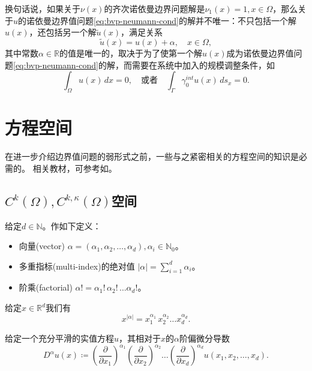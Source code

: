 换句话说，如果关于$\nu(x)$的齐次诺依曼边界问题解是$\nu_1(x)=1, x \in \Omega$，那么关于$u$的诺依曼边界值问题\eqref{eq:bvp-neumann-cond}的解并不唯一：不只包括一个解$u(x)$，还包括另一个解$\tilde{u}(x)$，满足关系
\begin{equation*}
  \tilde{u}(x) = u(x) + \alpha, \quad x \in \Omega,
\end{equation*}
其中常数$\alpha \in \mathbb{R}$的值是唯一的，取决于为了使第一个解$u(x)$成为诺依曼边界值问题\eqref{eq:bvp-neumann-cond}的解，而需要在系统中加入的规模调整条件，如
\begin{equation*}
  \int_{\Omega} u(x) \, dx = 0, \quad \text{或者} \quad \int_{\Gamma} \gamma_0^{int}u(x) \, ds_x =0.
\end{equation*}

\section{方程空间}
在进一步介绍边界值问题的弱形式之前，一些与之紧密相关的方程空间的知识是必需的。
相关教材，可参考如\cite{McLean:2000ta, Adams:2003wi, Tartar:2007vm, Mazya:2009vz, Mazya:2009wu}。

\subsection{\texorpdfstring{$C^{k}(\Omega),C^{k,\kappa}(\Omega)$}{CK}空间}

给定$d \in \mathbb{N}$。作如下定义：
\begin{itemize}
  \item 向量(vector) $\alpha = \left( \alpha_1, \alpha_2, \ldots, \alpha_d \right), \alpha_i \in \mathbb{N}_0$。
  \item 多重指标(multi-index)的绝对值 $\left| \alpha \right|=\sum_{i=1}^{d} \alpha_i$。
  \item 阶乘(factorial) $\alpha ! = \alpha_1! \, \alpha_2 ! \,  \ldots \alpha_d !$。
\end{itemize}

给定$x \in \mathbb{R}^d$我们有
\begin{equation*}
  x^{\left| \alpha \right|} = x_1^{\alpha_1} \, x_2^{\alpha_2} \ldots x_d^{\alpha_d}.
\end{equation*}

给定一个充分平滑的实值方程$u$，其相对于$x$的$\alpha$阶偏微分导数
\begin{equation*}
  D^{\alpha} u(x) \coloneqq \left( \frac{\partial }{\partial x_{1}} \right)^{\alpha_1} \left( \frac{\partial }{\partial x_{2}} \right)^{\alpha_2} \ldots \left( \frac{\partial }{\partial x_{d}} \right)^{\alpha_d} u \left( x_1, x_2, \ldots, x_d \right).
\end{equation*}

